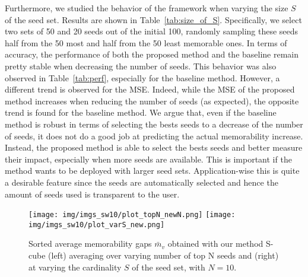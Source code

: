 \documentclass{sig-alternate-05-2015}
\begin{document}
Furthermore, we studied the behavior of the framework when varying the size $S$ of the seed set. Results are shown in Table~\ref{tab:size_of_S}. 
Specifically, we select two sets of 50 and 20 seeds out of the initial 100, randomly sampling these seeds half from the 50 most and half from the 50 least memorable ones.   
In terms of accuracy, the performance of both the proposed method and the baseline remain pretty stable when decreasing the number of seeds. This behavior was also observed in Table~\ref{tab:perf}, especially for the baseline method. However, a different trend is observed for the MSE. Indeed, while the MSE of the proposed method increases when reducing the number of seeds (as expected), the opposite trend is found for the baseline method. We argue that, even if the baseline method is robust in terms of selecting the bests seeds to a decrease of the number of seeds, it does not do a good job at predicting the actual memorability increase. Instead, the proposed method is able to select the bests seeds and better measure their impact, especially when more seeds are available. This is important if the method wants to be deployed with larger seed sets. Application-wise this is quite a desirable feature since the seeds are automatically selected and hence the amount of seeds used is transparent to the user.


\begin{figure}[t]
\hspace{-0.15cm}
\texttt{[image: img/imgs\_sw10/plot\_topN\_newN.png]}
\hspace{-0.2cm}
\texttt{[image: img/imgs\_sw10/plot\_varS\_new.png]}
\vspace{-0.3cm}
\caption{Sorted average memorability gaps $\bar{m}_v$ obtained with our method S-cube (left) averaging over varying number of top N seeds and (right) at varying the cardinality $S$ of the seed set, with $N=10$.}
\label{fig:delta_mem_stat1}
\vspace{-0.4cm}
\end{figure}
\end{document}
